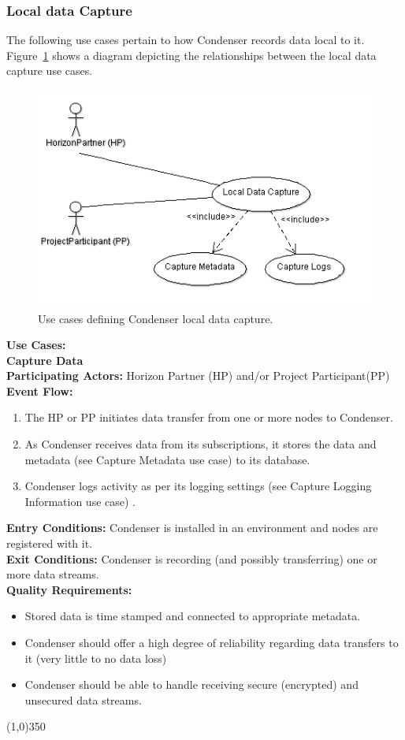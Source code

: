 \subsubsection{Local data Capture}		 
The following use cases pertain to how Condenser records data local to it. Figure~\ref{LocalDataCaptureUse} shows a diagram depicting the relationships between the local data capture use cases.
\begin{center}
	\begin{figure}[htbp]
		\includegraphics[scale=.75]{images/LocalDataCaptureUse.png}
		\caption{Use cases defining Condenser local data capture. \label{LocalDataCaptureUse}}
	\end{figure}
\end{center}	
\textbf{Use Cases:}\\

		\textbf{Capture Data}\\	 
		\textbf{Participating Actors:} Horizon Partner (HP) and/or Project Participant(PP) \\
		\textbf{Event Flow:}
		\begin{enumerate}
\item The HP or PP initiates data transfer from one or more nodes to Condenser.
\item As Condenser receives data from its subscriptions, it stores the data and metadata (see Capture Metadata use case) to its database.
\item Condenser logs activity as per its logging settings  (see Capture  Logging Information use case) .
	    \end{enumerate}
		\textbf{Entry Conditions:} Condenser is installed in an environment and nodes are registered with it.\\
		\textbf{Exit Conditions:} Condenser is recording (and possibly transferring) one or more data streams.\\
		\textbf{Quality Requirements:} 
		\begin{itemize}
\item Stored data is time stamped and connected to appropriate metadata.
\item Condenser should offer a high degree of reliability regarding data transfers to it (very little to no data loss)
\item Condenser should be able to handle receiving secure (encrypted) and unsecured data streams.
		\end{itemize}
		\line(1,0){350}	
		
